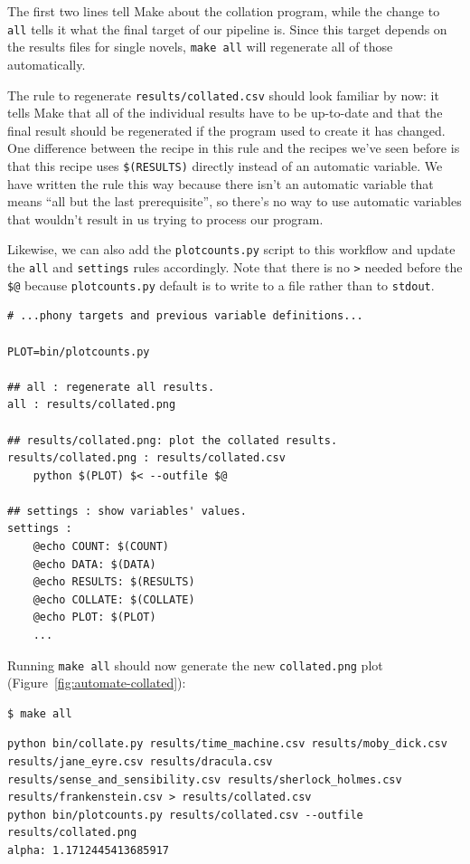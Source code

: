 \documentclass[
]{krantz}
\begin{document}
The first two lines tell Make about the collation program,
while the change to \texttt{all} tells it what the final target of our pipeline is.
Since this target depends on the results files for single novels,
\texttt{make\ all} will regenerate all of those automatically.

The rule to regenerate \texttt{results/collated.csv} should look familiar by now:
it tells Make that all of the individual results have to be up-to-date
and that the final result should be regenerated if the program used to create it has changed.
One difference between the recipe in this rule and the recipes we've seen before
is that this recipe uses \texttt{\$(RESULTS)} directly instead of an automatic variable.
We have written the rule this way because
there isn't an automatic variable that means ``all but the last prerequisite'',
so there's no way to use automatic variables that wouldn't result in us trying to process our program.

Likewise,
we can also add the \texttt{plotcounts.py} script to this workflow
and update the \texttt{all} and \texttt{settings} rules accordingly.
Note that there is no \texttt{\textgreater{}} needed before the \texttt{\$@}
because \texttt{plotcounts.py} default is to write to a file
rather than to \texttt{stdout}.

\begin{verbatim}
# ...phony targets and previous variable definitions...

PLOT=bin/plotcounts.py

## all : regenerate all results.
all : results/collated.png

## results/collated.png: plot the collated results.
results/collated.png : results/collated.csv
    python $(PLOT) $< --outfile $@

## settings : show variables' values.
settings :
    @echo COUNT: $(COUNT)
    @echo DATA: $(DATA)
    @echo RESULTS: $(RESULTS)
    @echo COLLATE: $(COLLATE)
    @echo PLOT: $(PLOT)
    ...
\end{verbatim}

Running \texttt{make\ all} should now generate the new \texttt{collated.png} plot (Figure~\ref{fig:automate-collated}):

\begin{verbatim}
$ make all
\end{verbatim}

\begin{verbatim}
python bin/collate.py results/time_machine.csv results/moby_dick.csv results/jane_eyre.csv results/dracula.csv results/sense_and_sensibility.csv results/sherlock_holmes.csv results/frankenstein.csv > results/collated.csv
python bin/plotcounts.py results/collated.csv --outfile results/collated.png
alpha: 1.1712445413685917
\end{verbatim}
\end{document}
